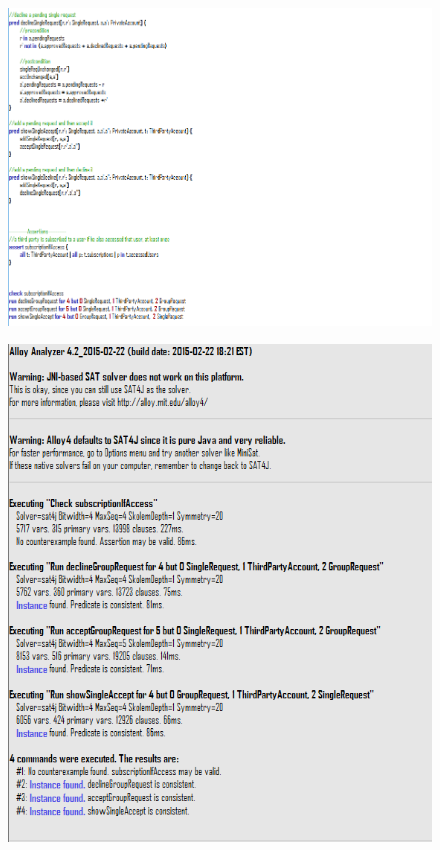 \documentclass[titlepage]{article}
\begin{document}
		\begin{figure}[H]
			\center
  			\includegraphics[width=\textwidth]{Alloy/Dynamic5.png}
			\label{fig:dyn5}
		\end{figure}

		\begin{figure}[H]
			\center
  			\includegraphics[width=\textwidth]{Alloy/Dynamic6.png}
			\label{fig:dyn6}
		\end{figure}
\end{document}
